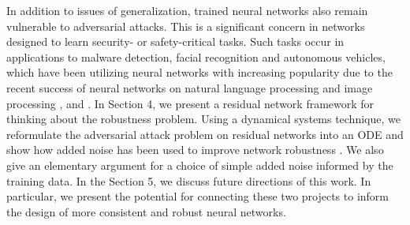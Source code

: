 \documentclass[12pt]{article}
\begin{document}
\indent In addition to issues of generalization, trained neural networks also remain vulnerable to adversarial attacks. This is a significant concern in networks designed to learn security- or safety-critical tasks. Such tasks occur in applications to malware detection, facial recognition and autonomous vehicles, which have been utilizing neural networks with increasing popularity due to the recent success of neural networks on natural language processing and image processing \cite{imageconv}, \cite{rectifiers} and \cite{langproc}. In Section 4, we present a residual network framework for thinking about the robustness problem. Using a dynamical systems technique, we reformulate the adversarial attack problem on residual networks into an ODE and show how added noise has been used to improve network robustness \cite{res}. We also give an elementary argument for a choice of simple added noise informed by the training data. In the Section 5, we discuss future directions of this work. In particular, we present the potential for connecting these two projects to inform the design of more consistent and robust neural networks.
\end{document}
